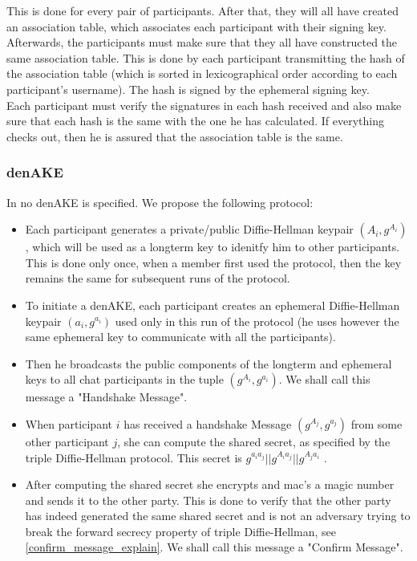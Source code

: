 \documentclass[12pt,titlepage,a4paper]{article}
\begin{document}
{This is done for every pair of participants. After that, they will all have
created an association table, which associates each participant with their
signing key. Afterwards, the participants must make sure that they all have
constructed the same association table. This is done by each participant
transmitting the hash of the association table (which is sorted in
lexicographical order according to each participant's username). The hash
is signed by the ephemeral signing key. \\

Each participant must verify the signatures in each hash received and also
make sure that each hash is the same with the one he has calculated. If everything
checks out, then he is assured that the association table is the same.

\subsubsection{denAKE}


In \cite{mpotr} no denAKE is specified. We propose the following protocol:

\begin{itemize}

	\item[] Each participant generates a private/public Diffie-Hellman keypair $(A_i, g^{A_i})$, which will be used as a longterm key to idenitfy him to other participants. This
is done only once, when a member first used the protocol, then the key remains
the same for subsequent runs of the protocol.

	\item[] To initiate a denAKE, each participant creates an ephemeral Diffie-Hellman keypair
		$(a_i,g^{a_i})$ used only in this run of the protocol (he uses however the same ephemeral key
		to communicate with all the participants).

	\item[] Then he broadcasts the public components of the longterm and ephemeral keys to
		all chat participants in the tuple $(g^{A_i}, g^{a_i})$. We shall call this
		message a "Handshake Message".

	\item[] When participant $i$ has received a handshake Message $(g^{A_j}, g^{a_j})$ from some
		other participant $j$, she can compute the shared secret, as specified by the triple
		Diffie-Hellman protocol. This secret is $g^{a_ia_j} || g^{A_ia_j} || g^{A_ja_i}$
		.

	\item[] After computing the shared secret she encrypts and mac's a magic number and sends it
		to the other party. This is done to verify that the other party has indeed generated
		the same shared secret and is not an adversary trying to break the forward secrecy
		property of triple Diffie-Hellman, see \ref{confirm_message_explain}. We shall call
		this message a "Confirm Message".


\end{itemize}}
\end{document}
